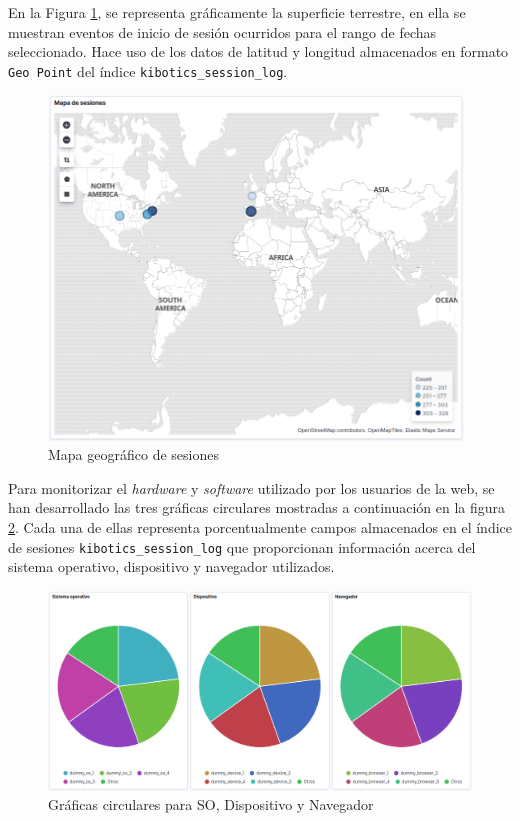 \documentclass[a4paper, 12pt]{book}
\begin{document}
		En la Figura \ref{fig:kibana_map}, se representa gráficamente la superficie terrestre, en ella se muestran eventos de inicio de sesión ocurridos para el rango de fechas seleccionado. Hace uso de los datos de latitud y longitud almacenados en formato \texttt{Geo Point} del índice \texttt{kibotics\_session\_log}.
		\begin{figure}[H]
			\centering
			\includegraphics[width=11cm, keepaspectratio]{img/kibana_06_map}
			\caption{Mapa geográfico de sesiones}
			\label{fig:kibana_map}
		\end{figure}
		
		Para monitorizar el \textit{hardware} y \textit{software} utilizado por los usuarios de la web, se han desarrollado las tres gráficas circulares mostradas a continuación en la figura \ref{fig:kibana_pie}. Cada una de ellas representa porcentualmente campos almacenados en el índice de sesiones  \texttt{kibotics\_session\_log} que proporcionan información acerca del sistema operativo, dispositivo y navegador utilizados.
		\begin{figure}[H]
			\centering
			\includegraphics[width=14cm, keepaspectratio]{img/kibana_07_pie}
			\caption{Gráficas circulares para SO, Dispositivo y Navegador}
			\label{fig:kibana_pie}
		\end{figure}
		
\end{document}
